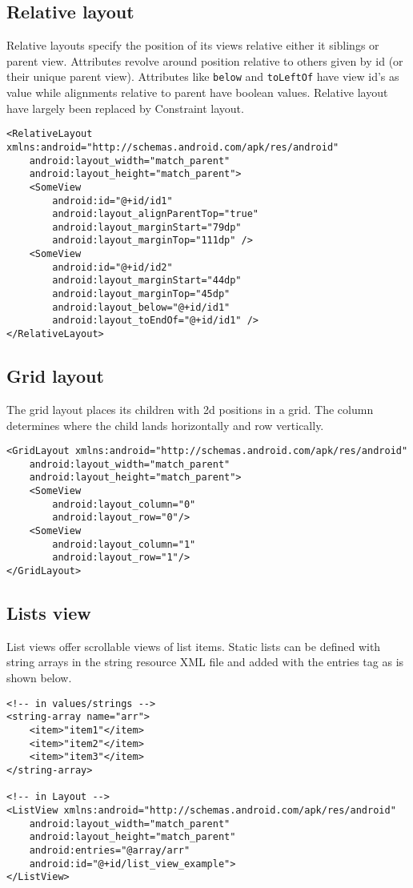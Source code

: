 \subsection{Relative layout}
Relative layouts specify the position of its views relative either it siblings or parent view. Attributes revolve around position relative to others given by id (or their unique parent view). Attributes like \texttt{below} and \texttt{toLeftOf} have view id's as value while alignments relative to parent have boolean values. Relative layout have largely been replaced by Constraint layout.
\begin{lstlisting}[style=A_XML]
<RelativeLayout xmlns:android="http://schemas.android.com/apk/res/android"
    android:layout_width="match_parent"
    android:layout_height="match_parent">
    <SomeView
        android:id="@+id/id1"
        android:layout_alignParentTop="true"
        android:layout_marginStart="79dp"
        android:layout_marginTop="111dp" />
    <SomeView
        android:id="@+id/id2"
        android:layout_marginStart="44dp"
        android:layout_marginTop="45dp"
        android:layout_below="@+id/id1"
        android:layout_toEndOf="@+id/id1" />
</RelativeLayout>
\end{lstlisting}

\subsection{Grid layout}
The grid layout places its children with 2d positions in a grid. The column determines where the child lands horizontally and row vertically.
\begin{lstlisting}[style=A_XML]
<GridLayout xmlns:android="http://schemas.android.com/apk/res/android"
    android:layout_width="match_parent"
    android:layout_height="match_parent">
    <SomeView
        android:layout_column="0"
        android:layout_row="0"/>
    <SomeView
        android:layout_column="1"
        android:layout_row="1"/>
</GridLayout>
\end{lstlisting}

\subsection{Lists view}
List views offer scrollable views of list items. Static lists can be defined with string arrays in the string resource XML file and added with the entries tag as is shown below.
\begin{lstlisting}[style=A_XML]
<!-- in values/strings -->
<string-array name="arr">
    <item>"item1"</item>
    <item>"item2"</item>
    <item>"item3"</item>
</string-array>

<!-- in Layout -->
<ListView xmlns:android="http://schemas.android.com/apk/res/android"
    android:layout_width="match_parent"
    android:layout_height="match_parent"
    android:entries="@array/arr"
    android:id="@+id/list_view_example">
</ListView>
\end{lstlisting}

